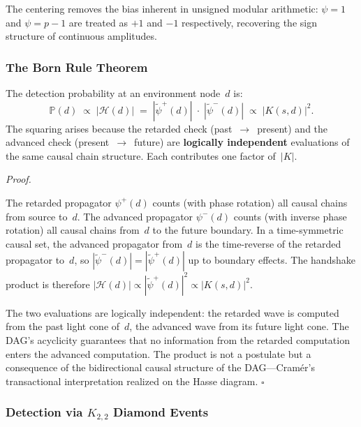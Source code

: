 \documentclass[11pt, a4paper, openany]{book}
\newcounter{thm}[chapter]
\renewenvironment{proof}[1][Proof]{%
  \par\noindent\textit{#1.}\quad
}{\hfill$\square$\par\medskip}
\begin{document}
\noindent
The centering removes the bias inherent in unsigned modular
arithmetic: $\psi = 1$ and $\psi = p - 1$ are treated as
$+1$ and $-1$ respectively, recovering the sign structure of
continuous amplitudes.

\subsubsection{The Born Rule Theorem}

\begin{theorem}
\label{thm:born-rule}
The detection probability at an environment node~$d$ is:
\begin{equation}
  \boxed{\;
  \mathbb{P}(d) \;\propto\; |\mathcal{H}(d)|
  \;=\; |\widetilde{\psi}^{+}(d)| \;\cdot\;
        |\widetilde{\psi}^{-}(d)|
  \;\propto\; |K(s,d)|^2.
  \;}
  \label{eq:born-rule}
\end{equation}
The squaring arises because the retarded check
(past~$\to$~present) and the advanced check
(present~$\to$~future) are \textbf{logically independent}
evaluations of the same causal chain structure. Each contributes
one factor of~$|K|$.
\end{theorem}

\begin{proof}
The retarded propagator $\psi^{+}(d)$ counts (with phase
rotation) all causal chains from source to~$d$. The advanced
propagator $\psi^{-}(d)$ counts (with inverse phase rotation)
all causal chains from~$d$ to the future boundary. In a
time-symmetric causal set, the advanced propagator from~$d$
is the time-reverse of the retarded propagator to~$d$, so
$|\widetilde{\psi}^{-}(d)| = |\widetilde{\psi}^{+}(d)|$
up to boundary effects. The handshake product is therefore
$|\mathcal{H}(d)| \propto |\widetilde{\psi}^{+}(d)|^2
\propto |K(s,d)|^2$.

The two evaluations are logically independent: the retarded
wave is computed from the past light cone of~$d$, the advanced
wave from its future light cone. The DAG's acyclicity
guarantees that no information from the retarded computation
enters the advanced computation. The product is not a postulate
but a consequence of the bidirectional causal structure of the
DAG---Cram\'er's transactional interpretation realized on the Hasse
diagram.
\end{proof}

\subsubsection{Detection via $K_{2,2}$ Diamond Events}
\end{document}
